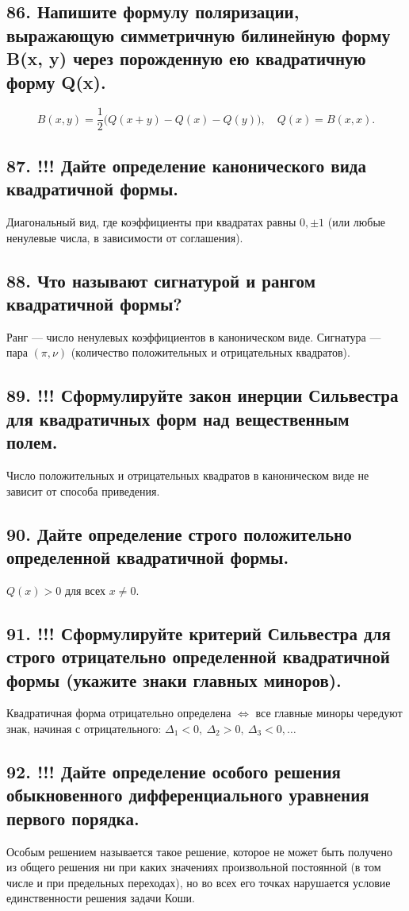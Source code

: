 \documentclass[a4paper,12pt]{article}
\begin{document}
\subsection*{86. Напишите формулу поляризации, выражающую симметричную билинейную форму B(x, y) через порожденную ею квадратичную форму Q(x).}
\[ B(x,y) = \frac{1}{2}\big(Q(x+y) - Q(x) - Q(y)\big), \quad Q(x)=B(x,x). \]

\subsection*{87. !!! Дайте определение канонического вида квадратичной формы.}
Диагональный вид, где коэффициенты при квадратах равны \(0, \pm 1\) (или любые ненулевые числа, в зависимости от соглашения).

\subsection*{88. Что называют сигнатурой и рангом квадратичной формы?}
Ранг — число ненулевых коэффициентов в каноническом виде. Сигнатура — пара \((\pi, \nu)\) (количество положительных и отрицательных квадратов).

\subsection*{89. !!! Сформулируйте закон инерции Сильвестра для квадратичных форм над вещественным полем.}
Число положительных и отрицательных квадратов в каноническом виде не зависит от способа приведения.

\subsection*{90. Дайте определение строго положительно определенной квадратичной формы.}
\(Q(x) > 0\) для всех \(x \ne 0\).

\subsection*{91. !!! Сформулируйте критерий Сильвестра для строго отрицательно определенной квадратичной формы (укажите знаки главных миноров).}
Квадратичная форма отрицательно определена \(\iff\) все главные миноры чередуют знак, начиная с отрицательного: \(\Delta_1 < 0,\ \Delta_2 > 0,\ \Delta_3 < 0, \dots\)

\subsection*{92. !!! Дайте определение особого решения обыкновенного дифференциального уравнения первого порядка.}
Особым решением называется такое решение, которое не может быть получено из общего решения ни при каких значениях произвольной постоянной (в том числе и при предельных переходах), но во всех его точках нарушается условие единственности решения задачи Коши.
\end{document}
